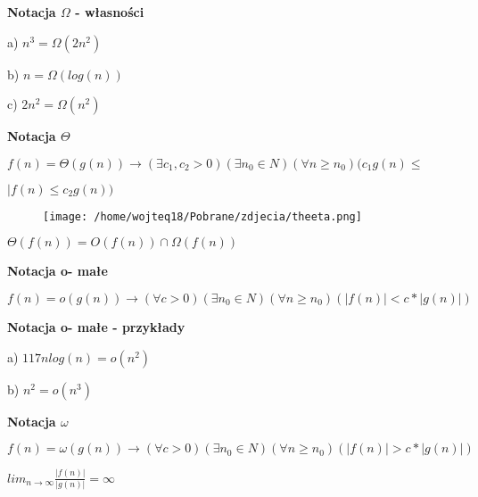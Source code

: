 \documentclass{article}
\begin{document}
\textbf{Notacja $\Omega$ - własności} \par
\vspace{1\baselineskip}
a) $n^3 = \Omega (2n^2)$ \par
\vspace{1\baselineskip}
b) $n = \Omega (log(n))$ \par
\vspace{1\baselineskip}
c) $2n^2 = \Omega (n^2)$ \par
\vspace{1\baselineskip}
\textbf{Notacja $\Theta$} \par
\vspace{1\baselineskip}
$f(n) = \Theta (g(n)) \rightarrow (\exists c_1, c_2 > 0)(\exists n_0 \in N)(\forall n  \geq n_0)(c_1 g(n) \leq $ \par $|f(n) \leq c_2 g(n))$ \par
\vspace{1\baselineskip}
\begin{figure}[H]
    \centering
    \texttt{[image: /home/wojteq18/Pobrane/zdjecia/theeta.png]}
    \label{fig:example_image}
\end{figure}
\vspace{1\baselineskip}
$\Theta (f(n)) = O(f(n)) \cap \Omega (f(n))$ \par
\vspace{1\baselineskip}
\textbf{Notacja o- małe} \par
\vspace{1\baselineskip}
$f(n) = o(g(n)) \rightarrow (\forall c > 0)(\exists n_0 \in N)(\forall n \geq n_0)(|f(n)| < c * |g(n)|)$ \par
\vspace{1\baselineskip}
\textbf{Notacja o- małe - przykłady} \par
\vspace{1\baselineskip}
a) $117n log(n) = o(n^2)$ \par
\vspace{1\baselineskip}
b) $ n^2 = o(n^3)$ \par
\vspace{1\baselineskip}
\textbf{Notacja $\omega$} \par
\vspace{1\baselineskip}
$f(n) = \omega (g(n)) \rightarrow (\forall c > 0)(\exists n_0 \in N)(\forall n \geq n_0)(|f(n)| > c * |g(n)|)$ \par
\vspace{1\baselineskip}
$lim_{n \to \infty} \frac{|f(n)|}{|g(n)|} = \infty$ \par
\end{document}
